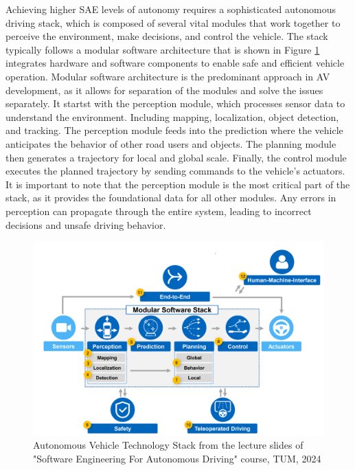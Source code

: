  Achieving higher SAE levels of autonomy requires a sophisticated autonomous driving stack,
 which is composed of several vital modules that work together to perceive the environment,
 make decisions, and control the vehicle. The stack typically follows a modular software
 architecture that is shown in Figure \ref{fig:AVStack} integrates hardware and software components to enable safe and
 efficient vehicle operation.
 Modular software architecture is the predominant approach in \ac{AV} development, as it allows for separation of the
 modules and solve the issues separately. It startst with the perception module, which processes sensor data to understand
 the environment. Including mapping, localization, object detection, and tracking. The perception module feeds into the prediction
 where the vehicle anticipates the behavior of other road users and objects. The planning module then generates a trajectory for local
 and global scale. Finally, the control module executes the planned trajectory by sending commands to the vehicle's actuators. It is important
 to note that the perception module is the most critical part of the stack, as it provides the foundational data for all other modules. Any errors
 in perception can propagate through the entire system, leading to incorrect decisions and unsafe driving behavior.

\begin{figure}[h]
    \includegraphics[scale=0.14]{figures/AVStack.png}
    \centering
    \caption{Autonomous Vehicle Technology Stack
    from the lecture slides of "Software Engineering For Autonomous Driving" course, TUM, 2024} %
    \label{fig:AVStack}
\end{figure}

